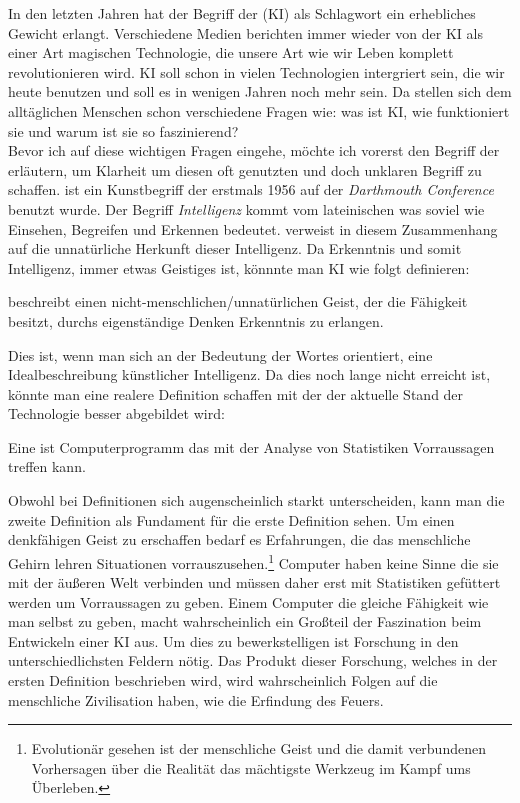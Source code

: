 \documentclass[12pt,german,ngerman]{report}
\begin{document}
    In den letzten Jahren hat der Begriff der  (KI) als Schlagwort ein erhebliches Gewicht
    erlangt. Verschiedene Medien berichten immer wieder von der KI als einer Art magischen Technologie, die unsere
    Art wie wir Leben komplett revolutionieren wird. KI soll schon in vielen Technologien intergriert sein, die wir heute
    benutzen und soll es in wenigen Jahren noch mehr sein. Da stellen sich dem alltäglichen Menschen schon
    verschiedene Fragen wie: was ist KI, wie funktioniert sie und warum ist sie so faszinierend?\\

    Bevor ich auf diese wichtigen Fragen eingehe, möchte ich vorerst den Begriff der 
    erläutern, um Klarheit um diesen oft genutzten und doch unklaren Begriff zu schaffen. 
     ist ein Kunstbegriff der erstmals
    1956 auf der \emph{Darthmouth Conference}\cite[57]{buchanan2005very} benutzt wurde.
    Der Begriff \emph{Intelligenz} kommt vom lateinischen  was soviel wie
    Einsehen, Begreifen und Erkennen bedeutet.\cite{piaget2000psychologie}
     verweist in diesem Zusammenhang auf die unnatürliche Herkunft dieser Intelligenz.
    Da Erkenntnis\cite{duden2021erkenntnis} und somit Intelligenz, immer etwas Geistiges ist, könnnte
    man KI wie folgt definieren:
    \begin{displayquote}
         beschreibt einen nicht-menschlichen/unnatürlichen Geist,
        der die Fähigkeit besitzt, durchs eigenständige Denken Erkenntnis zu erlangen.
    \end{displayquote}
    Dies ist, wenn man sich an der Bedeutung der Wortes orientiert, eine Idealbeschreibung künstlicher Intelligenz.
    Da dies noch lange nicht erreicht ist, könnte man eine realere Definition schaffen mit der der aktuelle
    Stand der Technologie besser abgebildet wird:
    \begin{displayquote}
        Eine  ist Computerprogramm das mit der Analyse von Statistiken Vorraussagen treffen kann.
    \end{displayquote}
    Obwohl bei Definitionen sich augenscheinlich starkt unterscheiden, kann man die zweite Definition als Fundament für
    die erste Definition sehen. Um einen denkfähigen Geist zu erschaffen bedarf es Erfahrungen, die das menschliche Gehirn lehren
    Situationen vorrauszusehen.\footnote{Evolutionär gesehen ist der menschliche Geist und die 
    damit verbundenen Vorhersagen über die Realität
    das mächtigste Werkzeug im Kampf ums Überleben.}
    Computer haben keine Sinne die sie mit der äußeren Welt verbinden und 
    müssen daher erst mit Statistiken gefüttert werden um Vorraussagen zu geben.
    Einem Computer die gleiche Fähigkeit wie man selbst zu geben, macht wahrscheinlich ein Großteil der Faszination
    beim Entwickeln einer KI aus. Um dies zu bewerkstelligen ist Forschung in den unterschiedlichsten Feldern nötig.
    Das Produkt dieser Forschung, welches in der ersten Definition beschrieben wird, wird wahrscheinlich Folgen auf
    die menschliche Zivilisation haben, wie die Erfindung des Feuers.\\
\end{document}
